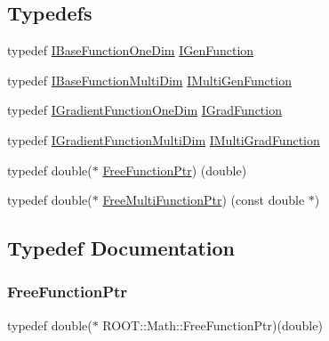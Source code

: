 \subsection*{Typedefs}
\begin{DoxyCompactItemize}
\item 
typedef \mbox{\hyperlink{classROOT_1_1Math_1_1IBaseFunctionOneDim}{I\+Base\+Function\+One\+Dim}} \mbox{\hyperlink{namespaceROOT_1_1Math_afe6400b4439b79d54c41fb9f5c5af171}{I\+Gen\+Function}}
\item 
typedef \mbox{\hyperlink{classROOT_1_1Math_1_1IBaseFunctionMultiDim}{I\+Base\+Function\+Multi\+Dim}} \mbox{\hyperlink{namespaceROOT_1_1Math_aec22897f3d759f7c284893c81d980799}{I\+Multi\+Gen\+Function}}
\item 
typedef \mbox{\hyperlink{classROOT_1_1Math_1_1IGradientFunctionOneDim}{I\+Gradient\+Function\+One\+Dim}} \mbox{\hyperlink{namespaceROOT_1_1Math_a2ff34b4dac0c7103abd9f3053e4666af}{I\+Grad\+Function}}
\item 
typedef \mbox{\hyperlink{classROOT_1_1Math_1_1IGradientFunctionMultiDim}{I\+Gradient\+Function\+Multi\+Dim}} \mbox{\hyperlink{namespaceROOT_1_1Math_a014e019aaf9304a00e9231bd9ed232fb}{I\+Multi\+Grad\+Function}}
\item 
typedef double($\ast$ \mbox{\hyperlink{namespaceROOT_1_1Math_a1626176a324764582ff287b704e2a4af}{Free\+Function\+Ptr}}) (double)
\item 
typedef double($\ast$ \mbox{\hyperlink{namespaceROOT_1_1Math_a8d555820603c5765e2a3959090f0d64d}{Free\+Multi\+Function\+Ptr}}) (const double $\ast$)
\end{DoxyCompactItemize}


\subsection{Typedef Documentation}
\mbox{\label{namespaceROOT_1_1Math_a1626176a324764582ff287b704e2a4af}} 
\subsubsection{\texorpdfstring{FreeFunctionPtr}{FreeFunctionPtr}}
{\footnotesize\ttfamily typedef double($\ast$ R\+O\+O\+T\+::\+Math\+::\+Free\+Function\+Ptr)(double)}

\mbox{\label{namespaceROOT_1_1Math_a8d555820603c5765e2a3959090f0d64d}} 
